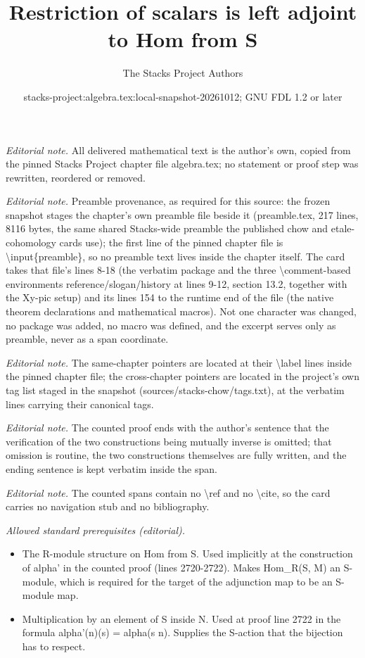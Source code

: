 \documentclass[10pt,a4paper]{amsart}
\title{Restriction of scalars is left adjoint to Hom from S}
\author{The Stacks Project Authors}
\date{stacks-project:algebra.tex:local-snapshot-20261012; GNU FDL 1.2 or later}
\theoremstyle{plain}
\theoremstyle{definition}
\theoremstyle{remark}
\numberwithin{equation}{subsection}
\begin{document}
\maketitle
\noindent\textit{Editorial note.} All delivered mathematical text is the author's own, copied from the pinned Stacks Project chapter file algebra.tex; no statement or proof step was rewritten, reordered or removed.\par\medskip
\noindent\textit{Editorial note.} Preamble provenance, as required for this source: the frozen snapshot stages the chapter's own preamble file beside it (preamble.tex, 217 lines, 8116 bytes, the same shared Stacks-wide preamble the published chow and etale-cohomology cards use); the first line of the pinned chapter file is \textbackslash{}input\{preamble\}, so no preamble text lives inside the chapter itself. The card takes that file's lines 8-18 (the verbatim package and the three \textbackslash{}comment-based environments reference/slogan/history at lines 9-12, section 13.2, together with the Xy-pic setup) and its lines 154 to the runtime end of the file (the native theorem declarations and mathematical macros). Not one character was changed, no package was added, no macro was defined, and the excerpt serves only as preamble, never as a span coordinate.\par\medskip
\noindent\textit{Editorial note.} The same-chapter pointers are located at their \textbackslash{}label lines inside the pinned chapter file; the cross-chapter pointers are located in the project's own tag list staged in the snapshot (sources/stacks-chow/tags.txt), at the verbatim lines carrying their canonical tags.\par\medskip
\noindent\textit{Editorial note.} The counted proof ends with the author's sentence that the verification of the two constructions being mutually inverse is omitted; that omission is routine, the two constructions themselves are fully written, and the ending sentence is kept verbatim inside the span.\par\medskip
\noindent\textit{Editorial note.} The counted spans contain no \textbackslash{}ref and no \textbackslash{}cite, so the card carries no navigation stub and no bibliography.\par\medskip
\noindent\textit{Allowed standard prerequisites (editorial).}\begin{itemize}
\item The R-module structure on Hom from S. Used implicitly at the construction of alpha' in the counted proof (lines 2720-2722). Makes Hom\_R(S, M) an S-module, which is required for the target of the adjunction map to be an S-module map.
\item Multiplication by an element of S inside N. Used at proof line 2722 in the formula alpha'(n)(s) = alpha(s n). Supplies the S-action that the bijection has to respect.
\end{itemize}\medskip
\end{document}
